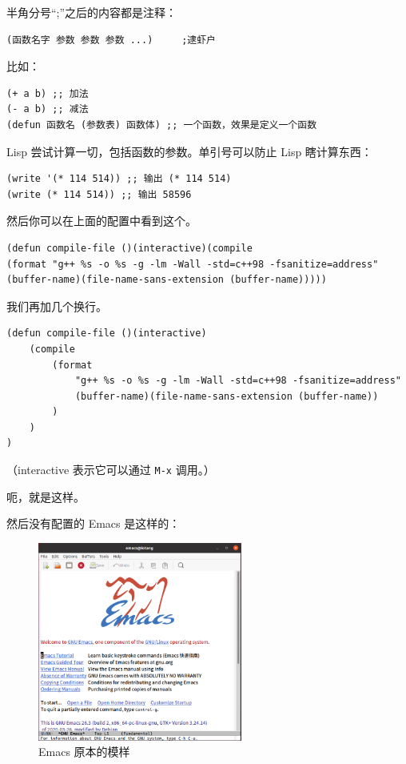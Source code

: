 \documentclass[UTF-8]{ctexart}
\begin{document}
				半角分号“;”之后的内容都是注释：
				
				\begin{verbatim}
(函数名字 参数 参数 参数 ...)     ;逮虾户
				\end{verbatim}
			
				比如：
				
				\begin{verbatim}
(+ a b) ;; 加法
(- a b) ;; 减法
(defun 函数名 (参数表) 函数体) ;; 一个函数，效果是定义一个函数
				\end{verbatim}
			
				Lisp 尝试计算一切，包括函数的参数。单引号可以防止 Lisp 瞎计算东西：
				
				\begin{verbatim}
(write '(* 114 514)) ;; 输出 (* 114 514)
(write (* 114 514)) ;; 输出 58596
				\end{verbatim}
				
				然后你可以在上面的配置中看到这个。
				
				\begin{verbatim}
(defun compile-file ()(interactive)(compile 
(format "g++ %s -o %s -g -lm -Wall -std=c++98 -fsanitize=address" 
(buffer-name)(file-name-sans-extension (buffer-name)))))
				\end{verbatim}
			
				我们再加几个换行。
				
				\begin{verbatim}
(defun compile-file ()(interactive)
    (compile 
        (format
            "g++ %s -o %s -g -lm -Wall -std=c++98 -fsanitize=address" 
            (buffer-name)(file-name-sans-extension (buffer-name))
        )
    )
)
				\end{verbatim}
			
				（interactive 表示它可以通过 \texttt{M-x} 调用。）
				
				呃，就是这样。
				
				然后没有配置的 Emacs 是这样的：
				
				\begin{figure}[H]
					\centering
					\includegraphics[width=0.6\textwidth]{fig/emacs_orig.png}
					\caption*{Emacs 原本的模样}
				\end{figure}
				
\end{document}
